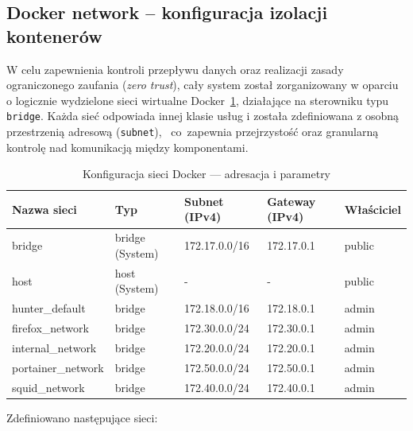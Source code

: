 \documentclass[
    left=2.5cm,         %
    right=2.5cm,        %
    top=2.5cm,          %
    bottom=3cm,         %
    bindingoffset=6mm,  %
    nohyphenation=true %
]{eiti/eiti-thesis} %
\begin{document}
\subsection{Docker network – konfiguracja izolacji kontenerów}

W celu zapewnienia kontroli przepływu danych oraz realizacji zasady ograniczonego zaufania (\textit{zero trust}), cały system został zorganizowany w oparciu 
o logicznie wydzielone sieci wirtualne Docker~\ref{tab:docker-networks}, działające na sterowniku typu \texttt{bridge}. Każda sieć odpowiada innej klasie usług 
i została zdefiniowana z osobną przestrzenią adresową (\texttt{subnet}), ~co~zapewnia przejrzystość oraz granularną kontrolę nad komunikacją między komponentami.

\begin{table}[H]
\centering
\caption{Konfiguracja sieci Docker — adresacja i parametry}
\label{tab:docker-networks}
\begin{tabularx}{\textwidth}{|l|l|l|l|X|}
\hline
\textbf{Nazwa sieci} & \textbf{Typ} & \textbf{Subnet (IPv4)} & \textbf{Gateway (IPv4)} & \textbf{Właściciel} \\
\hline
bridge & bridge (System) & 172.17.0.0/16 & 172.17.0.1 & public \\
\hline
host & host (System) & - & - & public \\
\hline
hunter\_default & bridge & 172.18.0.0/16 & 172.18.0.1 & admin \\
\hline
firefox\_network & bridge & 172.30.0.0/24 & 172.30.0.1 & admin \\
\hline
internal\_network & bridge & 172.20.0.0/24 & 172.20.0.1 & admin \\
\hline
portainer\_network & bridge & 172.50.0.0/24 & 172.50.0.1 & admin \\
\hline
squid\_network & bridge & 172.40.0.0/24 & 172.40.0.1 & admin \\
\hline
\end{tabularx}
\end{table}


Zdefiniowano następujące sieci:
\end{document}
